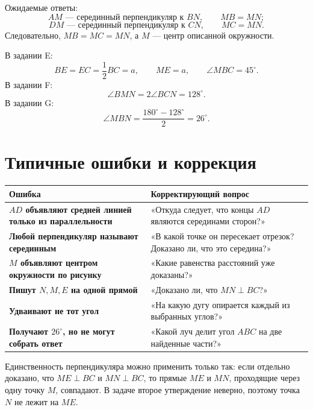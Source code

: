 \begin{teacherbox}
Ожидаемые ответы:
\[
AM\text{ — серединный перпендикуляр к }BN,
\qquad
MB=MN;
\]
\[
DM\text{ — серединный перпендикуляр к }CN,
\qquad
MC=MN.
\]
Следовательно, \(MB=MC=MN\), а \(M\) — центр описанной окружности.
\end{teacherbox}

\begin{teacherbox}[E–G. Углы]
В задании E:
\[
BE=EC=\frac12BC=a,
\qquad ME=a,
\qquad \angle MBC=45^\circ.
\]
В задании F:
\[
\angle BMN=2\angle BCN=128^\circ.
\]
В задании G:
\[
\angle MBN=\frac{180^\circ-128^\circ}{2}=26^\circ.
\]
\end{teacherbox}

\section{Типичные ошибки и коррекция}

\begin{tabularx}{\linewidth}{@{}>{\bfseries}p{43mm}X@{}}
\toprule
Ошибка & Корректирующий вопрос\\
\midrule
\(AD\) объявляют средней линией только из параллельности & «Откуда следует,
что концы \(AD\) являются серединами сторон?»\\
\midrule
Любой перпендикуляр называют серединным & «В какой точке он пересекает
отрезок? Доказано ли, что это середина?»\\
\midrule
\(M\) объявляют центром окружности по рисунку & «Какие равенства расстояний
уже доказаны?»\\
\midrule
Пишут \(N,M,E\) на одной прямой & «Доказано ли, что \(MN\perp BC\)?»\\
\midrule
Удваивают не тот угол & «На какую дугу опирается каждый из выбранных углов?»\\
\midrule
Получают \(26^\circ\), но не могут собрать ответ & «Какой луч делит угол
\(ABC\) на две найденные части?»\\
\bottomrule
\end{tabularx}

\begin{warningbox}
Единственность перпендикуляра можно применить только так: если отдельно
доказано, что \(ME\perp BC\) и \(MN\perp BC\), то прямые \(ME\) и \(MN\),
проходящие через одну точку \(M\), совпадают. В задаче второе утверждение
неверно, поэтому точка \(N\) не лежит на \(ME\).
\end{warningbox}


